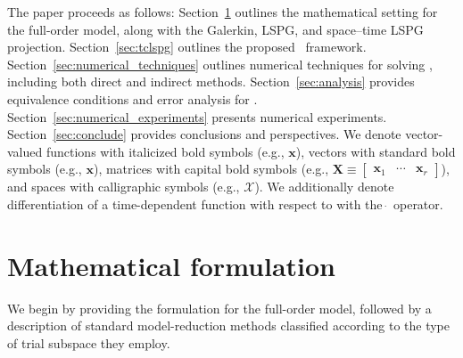 \documentclass[3p,computermodern,10pt]{elsarticle}
\begin{document}
The paper proceeds as follows: Section~\ref{sec:math}
outlines the mathematical setting for the full-order model, along with the Galerkin, LSPG, and
space--time LSPG projection. Section~\ref{sec:tclspg} outlines the proposed \methodAcronym\
framework. Section~\ref{sec:numerical_techniques}
outlines numerical techniques for solving \methodAcronymROMs, including both direct and
indirect methods. Section~\ref{sec:analysis} provides
equivalence conditions and error analysis for \methodAcronymROMs.
Section~\ref{sec:numerical_experiments} presents numerical experiments.
Section~\ref{sec:conclude} provides conclusions and perspectives.
We denote vector-valued functions with italicized bold symbols (e.g., $\boldsymbol
x$), vectors with standard bold symbols (e.g., $\mathbf{x}$), 
matrices with capital bold symbols (e.g., $\mathbf{X} \equiv \begin{bmatrix}
\mathbf{x}_1 & \cdots & \mathbf{x}_r\end{bmatrix}$), and spaces with
calligraphic symbols (e.g., $\mathcal{X}$). We additionally denote differentiation of a time-dependent 
function with respect to with the $\dot\ $ operator.
\section{Mathematical formulation}\label{sec:math}
	We begin by providing the formulation for the full-order model,
	followed by a description of standard model-reduction methods
	classified according to the type of trial subspace they employ.
\end{document}
